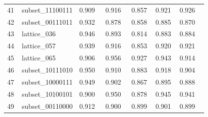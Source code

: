 \begin{longtable}{lp{0.167\linewidth}p{0.133\linewidth}p{0.133\linewidth}p{0.122\linewidth}p{0.122\linewidth}p{0.144\linewidth}}
41 & subset\_\allowbreak{}11100111 & 0.909 & 0.916 & 0.857 & 0.921 & 0.926 \\
42 & subset\_\allowbreak{}00111011 & 0.932 & 0.878 & 0.858 & 0.885 & 0.870 \\
43 & lattice\_\allowbreak{}036 & 0.946 & 0.893 & 0.814 & 0.883 & 0.884 \\
44 & lattice\_\allowbreak{}057 & 0.939 & 0.916 & 0.853 & 0.920 & 0.921 \\
45 & lattice\_\allowbreak{}065 & 0.906 & 0.956 & 0.927 & 0.943 & 0.914 \\
46 & subset\_\allowbreak{}10111010 & 0.950 & 0.910 & 0.883 & 0.918 & 0.904 \\
47 & subset\_\allowbreak{}10000111 & 0.949 & 0.902 & 0.867 & 0.895 & 0.888 \\
48 & subset\_\allowbreak{}10100101 & 0.900 & 0.950 & 0.878 & 0.945 & 0.941 \\
49 & subset\_\allowbreak{}00110000 & 0.912 & 0.900 & 0.899 & 0.901 & 0.899 \\
\bottomrule
\end{longtable}
\normalsize
